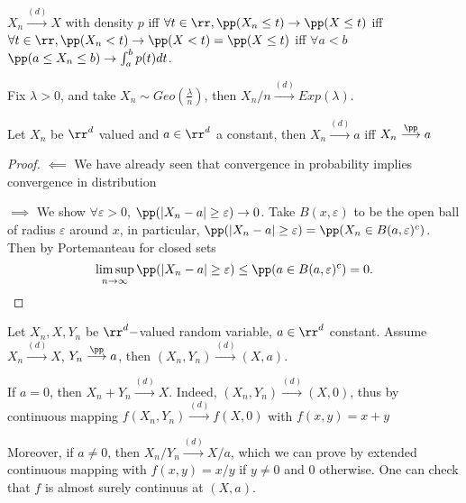 \documentclass[../main.tex]{subfiles}
\begin{document}
\begin{corollary}
  $X_n \overset{(d)}{\longrightarrow} X$ with density $p$ iff $\forall t \in
  \rr, \pp(X_n \leq t) \to \pp(X \leq t)$ iff $\forall t \in \rr, \pp(X_n < t)
  \to \pp(X < t) = \pp(X \leq t)$ iff $\forall a < b$ $\pp(a \leq X_n \leq b)
  \to \int_{a}^b p(t) dt$.
\end{corollary}
\begin{application}
  Fix $\lambda > 0$, and take $X_n \sim Geo(\frac{\lambda}{n} )$, then $X_n / n
  \overset{(d)}{\longrightarrow} Exp(\lambda)$. 
\end{application}

\begin{proposition}
    Let $X_n$ be $\rr^d$ valued and $a \in \rr^d$ a constant, then $X_n
    \overset{(d)}{\longrightarrow}a$ iff $X_n \overset{\pp}{\longrightarrow}a$
\end{proposition}
\begin{proof}
  $\boxed{\impliedby}$ We have already seen that convergence in probability
  implies convergence in distribution 

  $\boxed{\implies}$ We show $\forall \varepsilon > 0$, $\pp(|X_n - a| \geq
  \varepsilon) \to 0$. Take $B(x, \varepsilon)$ to be the open ball of radius
  $\varepsilon$ around $x$, in particular, $\pp(|X_n - a| \geq \varepsilon) =
  \pp(X_n \in B(a, \varepsilon)^c)$. Then by Portemanteau for closed sets
  \[
    \limsup_{n \to \infty} \pp(|X_n - a| \geq \varepsilon) \leq \pp(a \in B(a,
    \varepsilon)^c) = 0
  .\] 
\end{proof}
\begin{theorem}
  Let $X_n, X, Y_n$ be $\rr^d-$valued random variable, $a \in \rr^d$ constant.
  Assume $X_n \overset{(d)}{\longrightarrow} X$, $Y_n
  \overset{\pp}{\longrightarrow} a$, then $(X_n, Y_n)
  \overset{(d)}{\longrightarrow} (X, a)$.
\end{theorem}
\begin{application}
  If $a = 0$, then $X_n + Y_n \overset{(d)}{\longrightarrow} X$. Indeed, $(X_n,
  Y_n) \overset{(d)}{\longrightarrow} (X, 0)$, thus by continuous mapping
  $f(X_n, Y_n) \overset{(d)}{\longrightarrow} f(X, 0)$ with $f(x, y) = x+y$

  Moreover, if $a \neq 0$, then $X_n / Y_n \overset{(d)}{\longrightarrow} X /
  a$, which we can prove by extended continuous mapping with $f(x, y) = x / y$
  if $y \neq 0$ and $0$ otherwise. One can check that $f$ is almost surely
  continuus at $(X, a)$.
\end{application}
\end{document}
